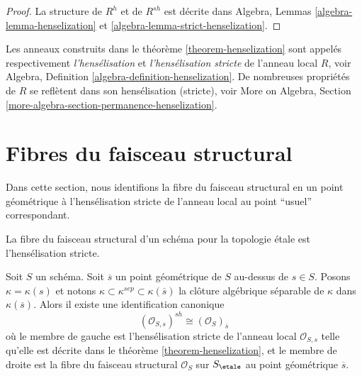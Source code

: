 \begin{proof}
La structure de $R^h$ et de $R^{sh}$ est d\'ecrite dans
Algebra, Lemmas \ref{algebra-lemma-henselization} et
\ref{algebra-lemma-strict-henselization}.
\end{proof}

\noindent
Les anneaux construits dans le th\'eor\`eme \ref{theorem-henselization}
sont appel\'es respectivement {\it l'hens\'elisation} et
{\it l'hens\'elisation stricte} de l'anneau local $R$, voir
Algebra, Definition \ref{algebra-definition-henselization}.
De nombreuses propri\'et\'es de $R$ se refl\`etent dans son hens\'elisation (stricte),
voir More on Algebra,
Section \ref{more-algebra-section-permanence-henselization}.




\section{Fibres du faisceau structural}
\label{section-stalks-structure-sheaf}

\noindent
Dans cette section, nous identifions la fibre du faisceau structural en un point
g\'eom\'etrique \`a l'hens\'elisation stricte de l'anneau local au point
``usuel'' correspondant.

\begin{lemma}
\label{lemma-describe-etale-local-ring}
\begin{slogan}
La fibre du faisceau structural d'un sch\'ema
pour la topologie \'etale est l'hens\'elisation stricte.
\end{slogan}
Soit $S$ un sch\'ema.
Soit $\overline{s}$ un point g\'eom\'etrique de $S$ au-dessus de $s \in S$.
Posons $\kappa = \kappa(s)$ et notons
$\kappa \subset \kappa^{sep} \subset \kappa(\overline{s})$
la cl\^oture alg\'ebrique s\'eparable de $\kappa$ dans $\kappa(\overline{s})$.
Alors il existe une identification canonique
$$
(\mathcal{O}_{S, s})^{sh}
\cong
(\mathcal{O}_S)_{\overline{s}}
$$
o\`u le membre de gauche est l'hens\'elisation stricte de l'anneau local
$\mathcal{O}_{S, s}$ telle qu'elle est d\'ecrite dans le
th\'eor\`eme \ref{theorem-henselization},
et le membre de droite est la fibre du faisceau structural
$\mathcal{O}_S$ sur $S_\etale$ au
point g\'eom\'etrique $\overline{s}$.
\end{lemma}

